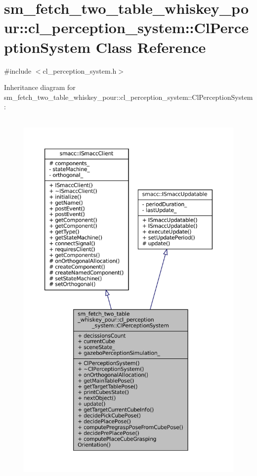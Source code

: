 \hypertarget{classsm__fetch__two__table__whiskey__pour_1_1cl__perception__system_1_1ClPerceptionSystem}{}\section{sm\+\_\+fetch\+\_\+two\+\_\+table\+\_\+whiskey\+\_\+pour\+:\+:cl\+\_\+perception\+\_\+system\+:\+:Cl\+Perception\+System Class Reference}
\label{classsm__fetch__two__table__whiskey__pour_1_1cl__perception__system_1_1ClPerceptionSystem}


{\ttfamily \#include $<$cl\+\_\+perception\+\_\+system.\+h$>$}



Inheritance diagram for sm\+\_\+fetch\+\_\+two\+\_\+table\+\_\+whiskey\+\_\+pour\+:\+:cl\+\_\+perception\+\_\+system\+:\+:Cl\+Perception\+System\+:
\nopagebreak
\begin{figure}[H]
\begin{center}
\leavevmode
\includegraphics[height=550pt]{classsm__fetch__two__table__whiskey__pour_1_1cl__perception__system_1_1ClPerceptionSystem__inherit__graph}
\end{center}
\end{figure}



